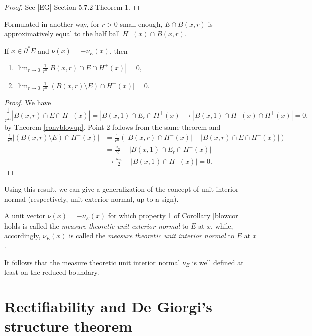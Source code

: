 \begin{proof} See [EG] Section 5.7.2 Theorem 1.
\end{proof}

Formulated in another way, for $r > 0$ small enough, $E \cap B(x, r)$ is approximatively equal to the half ball $H^{-}(x) \cap B(x, r)$.

\begin{corollary} \label{blowcor} If $x \in \partial^{*}E$ and $\nu(x) = - \nu_{E}(x)$, then
\begin{enumerate}
	\item $\displaystyle \lim_{r \to 0} \frac{1}{r^{n}} |B(x,r) \cap E \cap H^{+}(x)| = 0,$
	\item $\displaystyle \lim_{r \to 0} \frac{1}{r^{n}} |(B(x,r) \setminus E) \cap H^{-}(x)| = 0.$
\end{enumerate}
\end{corollary}
\begin{proof} We have 
\[\frac{1}{r^{n}} |B(x,r) \cap E \cap H^{+}(x)| = |B(x,1) \cap E_{r} \cap H^{+}(x)| \to |B(x,1) \cap H^{-}(x) \cap H^{+}(x)| = 0,\]
by Theorem \ref{convblowup}. Point 2 follows from the same theorem and 
\begin{align*} \frac{1}{r^{n}} |(B(x,r) \setminus E) \cap H^{-}(x)| & = \frac{1}{r^{n}} ( |B(x,r) \cap H^{-}(x)| - |B(x,r) \cap E \cap H^{-}(x)|) \\
& = \frac{\omega_{n}}{2} - |B(x,1) \cap E_{r} \cap H^{-}(x)| \\
& \to \frac{\omega_{n}}{2} - |B(x,1) \cap H^{-}(x)| = 0. \end{align*}
\end{proof}

Using this result, we can give a generalization of the concept of unit interior normal (respectively, unit exterior normal, up to a sign).

\begin{definition} A unit vector $\nu(x) = - \nu_{E}(x)$ for which property 1 of Corollary \ref{blowcor} holds is called the {\em measure theoretic unit exterior normal} to $E$ at $x$, while, accordingly, $\nu_{E}(x)$ is called the {\em measure theoretic unit interior normal} to $E$ at $x$.
\end{definition}

It follows that the measure theoretic unit interior normal $\nu_{E}$ is well defined at least on the reduced boundary. 


\section{Rectifiability and De Giorgi's structure theorem}

